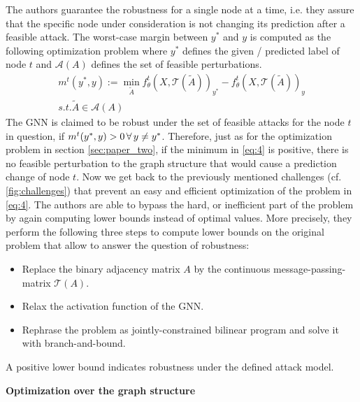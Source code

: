 \documentclass[a4paper,preprint]{sig-alternate}
\begin{document}
The authors guarantee the robustness for a single node at a time, i.e. they assure that the specific node under 
consideration is not changing its prediction after a feasible attack.
The worst-case margin between $y^{\ast}$ and $y$ is computed as the following optimization problem where $y^{\ast}$ defines the given / predicted 
label of node $t$ and $\mathcal{A}(A)$ defines the set of feasible perturbations.
\begin{gather}
\label{eq:4}
    m^t (y^{\ast}, y) := \min_{\tilde{A}} f_{\theta}^t (X, \mathcal{T}(\tilde{A}))_{y^{\ast}}
    - f_{\theta}^t (X, \mathcal{T}(\tilde{A}))_y \\
    s.t. \tilde{A} \in \mathcal{A}(A) \nonumber
\end{gather}
The GNN is claimed to be robust under the set of feasible attacks for the node $t$ in question,
if $m^t (y^{\ast}, y) > 0 \thinspace \forall \thinspace y \neq y^{\ast}$.
Therefore, just as for the optimization problem in section \ref{sec:paper_two}, if the minimum in \ref{eq:4} is positive, 
there is no feasible perturbation to the graph structure that would cause a prediction change of node $t$. \cite{10.1145/3394486.3403217}\newline
Now we get back to the previously mentioned challenges (cf. \ref{fig:challenges}) that prevent an easy and efficient optimization 
of the problem in \ref{eq:4}.
The authors are able to bypass the hard, or inefficient part of the problem by again computing lower bounds instead of optimal values.
More precisely, they perform the following three steps to compute lower bounds on the original problem that
allow to answer the question of robustness:
\begin{itemize}
    \item Replace the binary adjacency matrix $A$ by the continuous message-passing-matrix $\mathcal{T}(A)$.
    \item Relax the activation function of the GNN.
    \item Rephrase the problem as jointly-constrained bilinear program and solve it with branch-and-bound.
\end{itemize}
A positive lower bound indicates robustness under the defined attack model. \cite{10.1145/3394486.3403217}\newline

\textbf{Optimization over the graph structure}\newline
\end{document}
